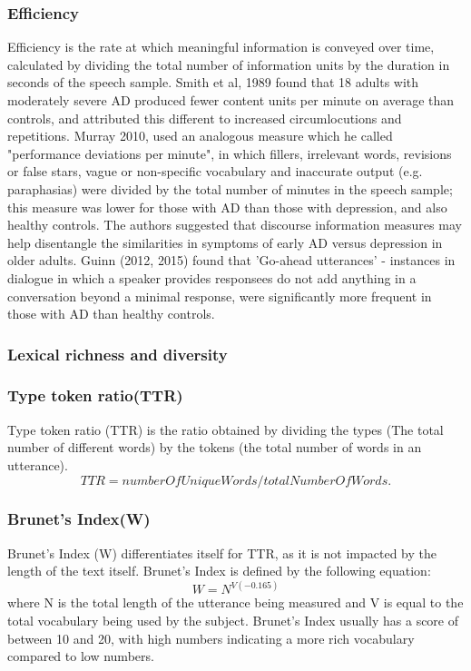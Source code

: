 \documentclass{article}
\begin{document}
\subsubsection{Efficiency}
Efficiency is the rate at which meaningful information is conveyed over time, calculated by dividing the total number of information units by the duration in seconds of the speech sample. Smith et al, 1989 found that 18 adults with moderately severe AD produced fewer content units per minute on average than controls, and attributed this different to increased circumlocutions and repetitions. Murray 2010, used an analogous measure which he called "performance deviations per minute", in which fillers, irrelevant words, revisions or false stars, vague or non-specific vocabulary and inaccurate output (e.g. paraphasias) were divided by the total number of minutes in the speech sample; this measure was lower for those with AD than those with depression, and also healthy controls. The authors suggested that discourse information measures may help disentangle the similarities in symptoms of early AD versus depression in older adults. Guinn (2012, 2015) \cite{Guinn2012, Guinn2015} found that 'Go-ahead utterances' - instances in dialogue in which a speaker provides responsees do not add anything in a conversation beyond a minimal response, were significantly more frequent in those with AD than healthy controls.
\subsubsection{Lexical richness and diversity}
\subsubsection{Type token ratio(TTR)}
Type token ratio (TTR) is the ratio obtained by dividing the types (The total number of different words) by the tokens (the total number of words in an utterance).
\begin{equation} \label{x1}
TTR = numberOfUniqueWords / totalNumberOfWords.
\end{equation}
\subsubsection{Brunet's Index(W)} %
Brunet's Index (W) differentiates itself for TTR, as it is not impacted by the length of the text itself. Brunet's Index is defined by the following equation:
\begin{equation} \label{x2}
W = N^{V(-0.165)}
\end{equation}
where N is the total length of the utterance being measured and V is equal to the total vocabulary being used by the subject. Brunet's Index usually has a score of between 10 and 20, with high numbers indicating a more rich vocabulary compared to low numbers. \newline
\par
\end{document}
